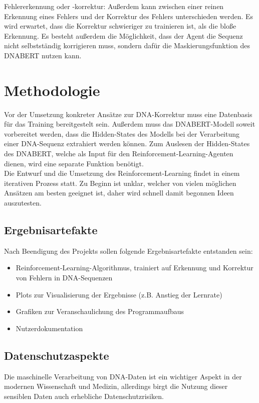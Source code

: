 \documentclass[oneside,bibliography=totocnumbered,BCOR=5mm]{scrbook}%
\theoremstyle{definition}
\theoremstyle{definition}
\theoremstyle{definition}
\theoremstyle{definition}
\theoremstyle{definition}
\theoremstyle{definition}
\begin{document}
Fehlererkennung oder -korrektur: Außerdem kann zwischen einer reinen Erkennung eines Fehlers und
der Korrektur des Fehlers unterschieden werden. Es wird erwartet, dass die Korrektur 
schwieriger zu trainieren ist, als die bloße Erkennung. Es besteht außerdem die Möglichkeit,
dass der Agent die Sequenz nicht selbstständig korrigieren muss, sondern dafür die Maskierungsfunktion
des DNABERT nutzen kann. \\

\clearpage

\chapter{Methodologie}

Vor der Umsetzung konkreter Ansätze zur DNA-Korrektur muss eine Datenbasis 
für das Training bereitgestelt sein. Außerdem muss das DNABERT-Modell soweit vorbereitet werden,
dass die Hidden-States des Modells bei der Verarbeitung einer DNA-Sequenz extrahiert werden können.
Zum Auslesen der Hidden-States des DNABERT, welche als Input für den Reinforcement-Learning-Agenten dienen,
wird eine separate Funktion benötigt. \\


Die Entwurf und die Umsetzung des Reinforcement-Learning findet in einem iterativen Prozess statt.
Zu Beginn ist unklar, welcher von vielen möglichen Ansätzen am besten geeignet ist, daher wird schnell
damit begonnen Ideen auszutesten. \\

\section{Ergebnisartefakte}
Nach Beendigung des Projekts sollen folgende Ergebnisartefakte entstanden sein: \\

\begin{itemize}
  \item Reinforcement-Learning-Algorithmus, trainiert auf Erkennung und Korrektur von Fehlern in DNA-Sequenzen
  \item Plots zur Visualisierung der Ergebnisse (z.B. Anstieg der Lernrate)
  \item Grafiken zur Veranschaulichung des Programmaufbaus
  \item Nutzerdokumentation
\end{itemize}

\section{Datenschutzaspekte}
Die maschinelle Verarbeitung von DNA-Daten ist ein wichtiger Aspekt in der 
modernen Wissenschaft und Medizin, allerdings birgt die Nutzung dieser 
sensiblen Daten auch erhebliche Datenschutzrisiken. \\
\end{document}
